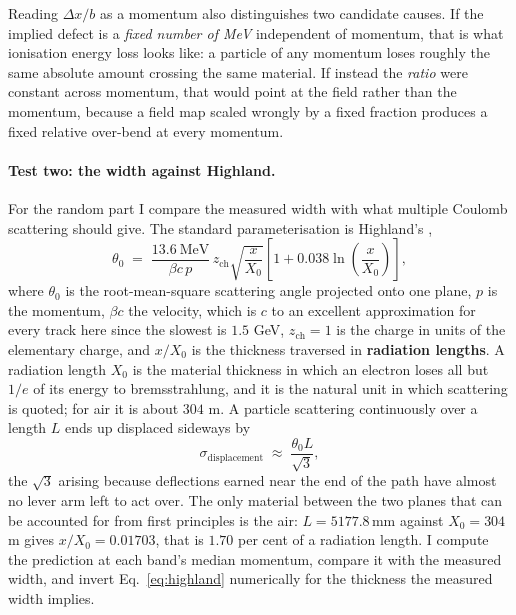 \documentclass[11pt,a4paper]{article}
\newcommand{\mm}{\ensuremath{\,\mathrm{mm}}}
\begin{document}
Reading $\Delta x / b$ as a momentum also distinguishes two candidate causes. If
the implied defect is a \emph{fixed number of MeV} independent of momentum, that
is what ionisation energy loss looks like: a particle of any momentum loses
roughly the same absolute amount crossing the same material. If instead the
\emph{ratio} were constant across momentum, that would point at the field rather
than the momentum, because a field map scaled wrongly by a fixed fraction
produces a fixed relative over-bend at every momentum.

\paragraph{Test two: the width against Highland.} For the random part I compare
the measured width with what multiple Coulomb scattering should give. The
standard parameterisation is Highland's \citep{lynch1991},
\begin{equation}
  \theta_0 \;=\; \frac{13.6\ \mathrm{MeV}}{\beta c\, p}\, z_{\mathrm{ch}}
  \sqrt{\frac{x}{X_0}}\left[1 + 0.038 \ln\!\left(\frac{x}{X_0}\right)\right],
  \label{eq:highland}
\end{equation}
where $\theta_0$ is the root-mean-square scattering angle projected onto one
plane, $p$ is the momentum, $\beta c$ the velocity, which is $c$ to an excellent
approximation for every track here since the slowest is $1.5$ GeV,
$z_{\mathrm{ch}} = 1$ is the charge in units of the elementary charge, and
$x/X_0$ is the thickness traversed in \textbf{radiation lengths}. A radiation
length $X_0$ is the material thickness in which an electron loses all but $1/e$
of its energy to bremsstrahlung, and it is the natural unit in which scattering
is quoted; for air it is about $304$ m. A particle scattering continuously over a
length $L$ ends up displaced sideways by
\begin{equation}
  \sigma_{\mathrm{displacement}} \;\approx\; \frac{\theta_0 L}{\sqrt{3}},
\end{equation}
the $\sqrt{3}$ arising because deflections earned near the end of the path have
almost no lever arm left to act over. The only material between the two planes
that can be accounted for from first principles is the air: $L = 5177.8\mm$
against $X_0 = 304$ m gives $x/X_0 = 0.01703$, that is $1.70$ per cent of a
radiation length. I compute the prediction at each band's median momentum,
compare it with the measured width, and invert Eq.~\eqref{eq:highland}
numerically for the thickness the measured width implies.
\end{document}
